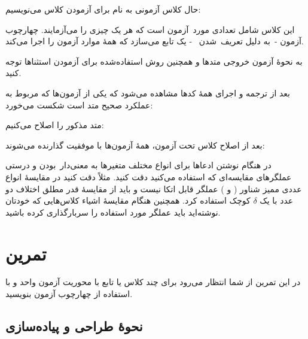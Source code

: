 \documentclass{utap}
\begin{document}
    حال کلاس آزمونی به نام  برای آزمودن کلاس  می‌نویسیم:
    \begin{latin}\end{latin}

    این کلاس شامل تعدادی مورد~آزمون است که هر یک چیزی را می‌آزمایند. چهارچوب آزمون ‐~به دلیل تعریف~شدن ~‐ یک تابع  می‌سازد که همهٔ موارد آزمون را اجرا می‌کند.

    به نحوهٔ آزمون خروجی متدها و همچنین روش استفاده‌شده برای آزمودن استثناها توجه کنید.

    بعد از ترجمه و اجرای همهٔ  کدها مشاهده می‌شود که یکی از آزمون‌ها که مربوط به عملکرد صحیح متد  است شکست می‌خورد:
    \begin{latin}\footnotesize
    \end{latin}

    متد مذکور را اصلاح می‌کنیم:
    \begin{latin}\end{latin}

    بعد از اصلاح کلاس تحت آزمون، همهٔ آزمون‌ها با موفقیت گذارنده می‌شوند:
    \begin{latin}\footnotesize
    \end{latin}

    در هنگام نوشتن ادعاها برای انواع مختلف متغیرها به معنی‌دار~بودن و درستی عملگرهای مقایسه‌ای که استفاده می‌کنید دقت کنید. مثلاً دقت کنید در مقایسهٔ انواع عددی ممیز شناور ( و ) عملگر \lr{\lstinline{==}} قابل اتکا نیست و باید از مقایسهٔ قدر مطلق اختلاف دو عدد با یک $\delta$ کوچک استفاده کرد. همچنین هنگام مقایسهٔ اشیاء کلاس‌هایی که خودتان نوشته‌اید باید عملگر مورد استفاده را سربارگذاری کرده باشید.

    \section{تمرین}

    در این تمرین از شما انتظار می‌رود برای چند کلاس یا تابع با محوریت آزمون واحد و با استفاده از چهارچوب  آزمون بنویسید.

    \subsection{نحوهٔ طراحی و پیاده‌سازی}
\end{document}
